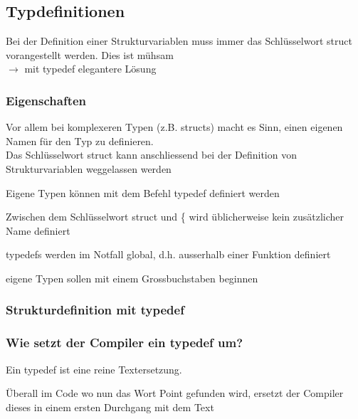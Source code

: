 	\subsection{Typdefinitionen}
		Bei der Definition einer Strukturvariablen muss immer das Schlüsselwort struct vorangestellt werden. Dies ist mühsam\\ $\rightarrow$ mit typedef elegantere Lösung
		\subsubsection{Eigenschaften}
			\begin{compactitem}
				\item Vor allem bei komplexeren Typen (z.B. structs) macht es Sinn, einen eigenen Namen für den Typ zu definieren.\\ Das Schlüsselwort struct kann anschliessend bei der Definition von Strukturvariablen weggelassen werden
				\item Eigene Typen können mit dem Befehl typedef definiert werden
				\item Zwischen dem Schlüsselwort struct und \{ wird üblicherweise kein zusätzlicher Name definiert
				\item typedefs werden im Notfall global, d.h. ausserhalb einer Funktion definiert
				\item eigene Typen sollen mit einem Grossbuchstaben beginnen 
			\end{compactitem} 
\newpage
	\begin{minipage}[t]{14 cm}
		\subsubsection{Strukturdefinition mit typedef}
			
	\end{minipage}
	\begin{minipage}[t]{4.5 cm}
		\subsubsection{Wie setzt der Compiler ein typedef um?}
			Ein typedef ist eine reine Textersetzung. 
			
			Überall im Code wo nun das Wort Point gefunden wird, ersetzt der Compiler dieses in einem ersten Durchgang mit dem Text
			 
	\end{minipage}